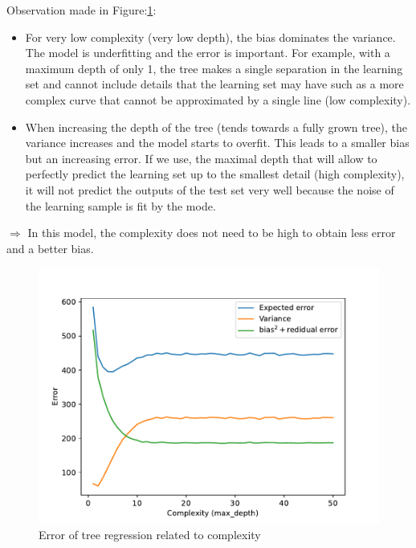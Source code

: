 \documentclass[12pt,titlepage]{article}
\begin{document}
Observation made in Figure:\ref{fig:error_dt}:

\begin{itemize}
    \item 
    For very low complexity (very low depth), the bias dominates the variance. The model is underfitting and the error is important. For example, with a maximum depth of only 1, the tree makes a single separation in the learning set and cannot include details that the learning set may have such as a more complex curve that cannot be approximated by a single line (low complexity).

    \item 
    When increasing the depth of the tree (tends towards a fully grown tree), the variance increases and the model starts to overfit. This leads to a smaller bias but an increasing error. If we use, the maximal depth that will allow to perfectly predict the learning set up to the smallest detail (high complexity), it will not predict the outputs of the test set very well because the noise of the learning sample is fit by the mode.
\end{itemize}

\vspace{0.3cm}

$\Rightarrow$ In this model, the complexity does not need to be high to obtain less error and a better bias.

\begin{figure}[H]
    \centering
    \includegraphics[scale = 0.8]{image/2.3_dt_regressor.pdf}
    \caption{Error of tree regression related to complexity}
    \label{fig:error_dt}
\end{figure}
\end{document}
